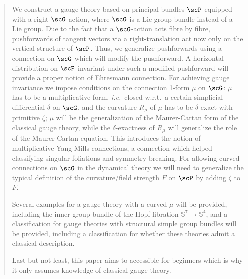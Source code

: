 \documentclass[reqno,a4paper,oneside]{amsart}
\theoremstyle{plain}
\theoremstyle{remark}
\theoremstyle{definition}
\begin{document}
\begin{titlepage}
\begin{quote}
				We construct a gauge theory based on principal bundles $\scP$ equipped with a right $\scG$-action, where $\scG$ is a Lie group bundle instead of a Lie group. Due to the fact that a $\scG$-action acts fibre by fibre, pushforwards of tangent vectors via a right-translation act now only on the vertical structure of $\scP$. Thus, we generalize pushforwards using a connection on $\scG$ which will modify the pushforward. A horizontal distribution on $\scP$ invariant under such a modified pushforward will provide a proper notion of Ehresmann connection. For achieving gauge invariance we impose conditions on the connection 1-form $\mu$ on $\scG$: $\mu$ has to be a multiplicative form, \textit{i.e.}\ closed w.r.t.\ a certain simplicial differential $\delta$ on $\scG$, and the curvature $R_\mu$ of $\mu$ has to be $\delta$-exact with primitive $\zeta$; $\mu$ will be the generalization of the Maurer-Cartan form of the classical gauge theory, while the $\delta$-exactness of $R_\mu$ will generalize the role of the Maurer-Cartan equation. This introduces the notion of multiplicative Yang-Mills connections, a connection which helped classifying singular foliations and symmetry breaking. For allowing curved connections on $\scG$ in the dynamical theory we will need to generalize the typical definition of the curvature/field strength $F$ on $\scP$ by adding $\zeta$ to $F$.
	
				Several examples for a gauge theory with a curved $\mu$ will be provided, including the inner group bundle of the Hopf fibration $\mathbb{S}^7 \to \mathbb{S}^4$, and a classification for gauge theories with structural simple group bundles will be provided, including a classification for whether these theories admit a classical description.

				Last but not least, this paper aims to accessible for beginners which is why it only assumes knowledge of classical gauge theory.
        \end{quote}
    \end{titlepage}




\tableofcontents




\renewcommand{\thefootnote}{\arabic{footnote}}
%
\setlength{\parindent}{12 pt}
\end{document}
